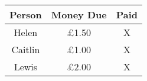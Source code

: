 \documentclass{standalone}
\def\tk{\tikz\fill[scale=0.4](0,.35) -- (.25,0) -- (1,.7) -- (.25,.15) -- cycle;}
\begin{document}
    \begin{tabular}{|c|c|c|}
        \hline
        \rowcolor{red} Person & Money Due & Paid \\
        \hline
        Helen & £1.50 & X \\
        Caitlin & £1.00 & X \\
        Lewis & £2.00 & X \\
        \hline
    \end{tabular}
\end{document}
